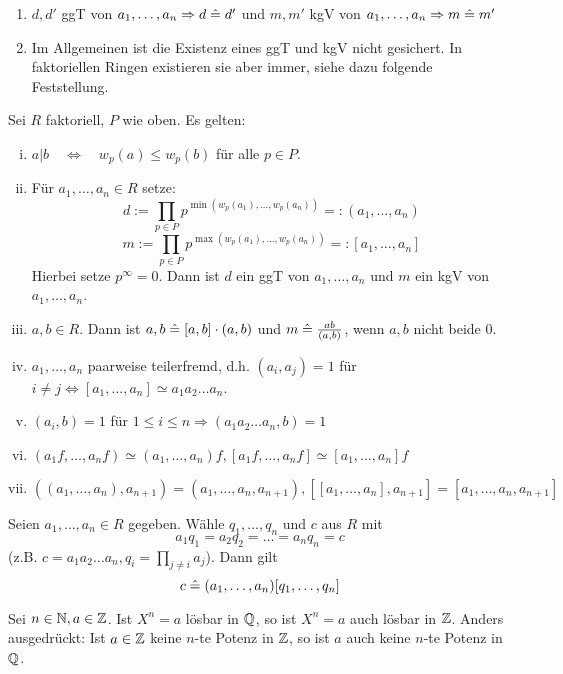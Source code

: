 	\begin{enumerate}[1)]
		\item $d, d'$ ggT von $a_1, \dots, a_n \Rightarrow d \mathrel{\hat=} d'$ und $m, m'$ kgV von $a_1, \dots, a_n \Rightarrow m \mathrel{\hat=} m'$
		\item Im Allgemeinen ist die Existenz eines ggT und kgV nicht gesichert. In faktoriellen Ringen existieren sie aber immer, siehe dazu folgende Feststellung.
	\end{enumerate}
	
\begin{falko} \label{F1.8}
	Sei $R$ faktoriell, $P$ wie oben. Es gelten: 
	\begin{enumerate}[(i)]
		\item $a | b \quad \Leftrightarrow \quad w_p(a) \leq w_p(b)$ für alle $p \in P$.
		\item Für $a_1, \dots, a_n \in R$ setze:
		\[d := \prod\limits_{p \in P} p^{\min(w_p(a_1),\dots,w_p(a_n))} =: (a_1,\dots,a_n) \]
		\[m := \prod\limits_{p \in P} p^{\max(w_p(a_1),\dots,w_p(a_n))} =: [a_1,\dots,a_n] \]
		Hierbei setze $p^\infty = 0$. Dann ist $d$ ein ggT von $a_1,\dots,a_n$ und $m$ ein kgV von $a_1,\dots,a_n$.
		\item $a,b \in R$. Dann ist $a,b \mathrel{\hat=} [a,b] \cdot (a,b)$ und $m \mathrel{\hat=} \frac{ab}{(a,b)}$, wenn $a,b$ nicht beide 0.
		\item $a_1,\dots,a_n$ paarweise teilerfremd, d.h. $(a_i,a_j) = 1$ für $i \neq j \Leftrightarrow [a_1,\dots,a_n] \simeq a_1a_2\dots a_n$.
		\item $(a_i,b)=1$ für $1 \leq i \leq n \Rightarrow (a_1a_2\dots a_n,b) = 1$
		\item $(a_1f,\dots,a_nf) \simeq (a_1,\dots,a_n)f, [a_1f,\dots,a_nf] \simeq [a_1,\dots,a_n]f$
		\item $((a_1,\dots,a_n),a_{n+1}) = (a_1,\dots,a_n,a_{n+1}), [[a_1,\dots,a_n],a_{n+1}] = [a_1,\dots,a_n,a_{n+1}]$
	\end{enumerate}
\end{falko}

	Seien $a_1,\dots,a_n \in R$ gegeben. Wähle $q_1,\dots,q_n$ und $c$ aus $R$ mit
	\[ a_1q_1 = a_2q_2 = \dots = a_n q_n = c \]
	(z.B. $c= a_1a_2 \dots a_n, q_i = \prod\limits_{j \neq i} a_j$). Dann gilt
	\[ c \mathrel{\hat=} (a_1,\dots,a_n)[q_1,\dots,q_n] \]
	
\begin{falko} \label{F1.9}
	Sei $n \in \mathbb{N}, a \in \mathbb{Z}$. Ist $X^n = a$ lösbar in $\mathbb{Q}$, so ist $X^n = a$ auch lösbar in $\mathbb{Z}$. Anders ausgedrückt: Ist $a \in \mathbb{Z}$ keine $n$-te Potenz in $\mathbb{Z}$, so ist $a$ auch keine $n$-te Potenz in $\mathbb{Q}$.
\end{falko}

